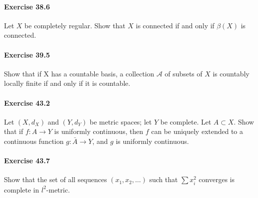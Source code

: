 \documentclass{article}
\begin{document}
\paragraph{Exercise 38.6} Let $X$ be completely regular. Show that $X$ is
connected if and only if $\beta(X)$ is connected.

\paragraph{Exercise 39.5} Show that if X has a countable basis, a collection
$\mathcal{A}$ of subsets of $X$ is countably locally finite if and only if it is
countable.

\paragraph{Exercise 43.2} Let $(X, d_X)$ and $(Y, d_Y)$ be metric spaces; let $Y$ be complete. Let $A \subset X$. Show that if $f \colon A \rightarrow Y$ is uniformly continuous, then $f$ can be uniquely extended to a continuous function $g \colon \bar{A} \rightarrow Y$, and $g$ is uniformly continuous.

\paragraph{Exercise 43.7} Show that the set of all sequences $(x_1, x_2, \ldots)$ such that $\sum x_i^2$ converges is complete in $l^2$-metric.
\end{document}
